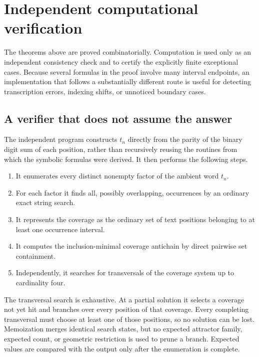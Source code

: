 \documentclass[10pt,a4paper]{article}
\theoremstyle{definition}\newtheorem{definition}[theorem]{Definition}
\theoremstyle{remark}\newtheorem{remark}[theorem]{Remark}
\begin{document}
\section{Independent computational verification}
\label{sec:computational-verification}

The theorems above are proved combinatorially.  Computation is used only as an independent consistency check and to certify the explicitly finite exceptional cases.  Because several formulas in the proof involve many interval endpoints, an implementation that follows a substantially different route is useful for detecting transcription errors, indexing shifts, or unnoticed boundary cases.

\subsection{A verifier that does not assume the answer}
\label{subsec:independent-verifier}

The independent program constructs $t_n$ directly from the parity of the binary digit sum of each position, rather than recursively reusing the routines from which the symbolic formulas were derived.  It then performs the following steps.

\begin{enumerate}[label=\arabic*.]
\item It enumerates every distinct nonempty factor of the ambient word $t_n$.
\item For each factor it finds all, possibly overlapping, occurrences by an ordinary exact string search.
\item It represents the coverage as the ordinary set of text positions belonging to at least one occurrence interval.
\item It computes the inclusion-minimal coverage antichain by direct pairwise set containment.
\item Independently, it searches for transversals of the coverage system up to cardinality four.
\end{enumerate}

The transversal search is exhaustive.  At a partial solution it selects a coverage not yet hit and branches over every position of that coverage.  Every completing transversal must choose at least one of those positions, so no solution can be lost.  Memoization merges identical search states, but no expected attractor family, expected count, or geometric restriction is used to prune a branch.  Expected values are compared with the output only after the enumeration is complete.
\end{document}
